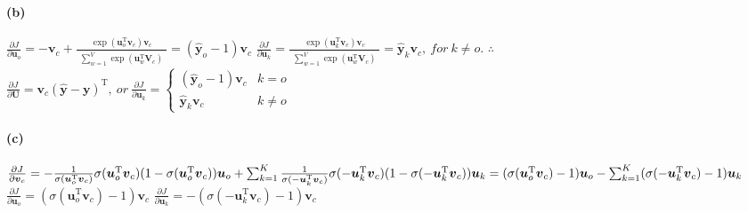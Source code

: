 \documentclass{article}
\begin{document}
\begin{spacing}{1.5}
\paragraph{(b)}
$ \frac{\partial J}{\partial \boldsymbol{u}_o}=-\boldsymbol{v}_c+ \frac{\exp(\boldsymbol{u}_o ^\mathrm{T}\boldsymbol{v}_c)\boldsymbol{v}_c}{\begin{matrix} \sum_{w=1}^V\exp(\boldsymbol{u}_w ^\mathrm{T}\boldsymbol{V}_c) \end{matrix}}=(\boldsymbol{\widehat{y}}_{o}-1)\boldsymbol{v}_c $ \newline
$ \frac{\partial J}{\partial \boldsymbol{u}_k}=\frac{\exp(\boldsymbol{u}_k ^\mathrm{T}\boldsymbol{v}_c)\boldsymbol{v}_c}{\begin{matrix} \sum_{w=1}^V\exp(\boldsymbol{u}_w ^\mathrm{T}\boldsymbol{V}_c) \end{matrix}}=\boldsymbol{\widehat{y}}_{k}\boldsymbol{v}_c,\ for \ k \neq o $. \newline
$ \boldsymbol{\therefore} $
$ \frac{\partial J}{\partial \boldsymbol{U}}=\boldsymbol{v}_c (\boldsymbol{\widehat{y}}-\boldsymbol{y})^\mathrm{T},\ or \ 
\frac{\partial J}{\partial \boldsymbol{u}_k}=
\begin{cases} (\boldsymbol{\widehat{y}}_{o}-1)\boldsymbol{v}_c &k=o \\ \boldsymbol{\widehat{y}}_{k}\boldsymbol{v}_c &k \neq o \end{cases} $
\paragraph{(c)}
$ \frac {\partial J}{\partial \boldsymbol{v}_c}=-\frac{1}{\sigma(\boldsymbol{u}_o ^\mathrm{T}\boldsymbol{v}_c)} \sigma(\boldsymbol{u}_o ^\mathrm{T}\boldsymbol{v}_c) (1-\sigma(\boldsymbol{u}_o ^\mathrm{T}\boldsymbol{v}_c)) \boldsymbol{u}_o
+ \sum_{k=1}^K \frac{1}{\sigma(-\boldsymbol{u}_k ^\mathrm{T}\boldsymbol{v}_c)} \sigma(-\boldsymbol{u}_k ^\mathrm{T}\boldsymbol{v}_c)(1-\sigma(-\boldsymbol{u}_k ^\mathrm{T}\boldsymbol{v}_c)) \boldsymbol{u}_k \\
=(\sigma(\boldsymbol{u}_o ^\mathrm{T}\boldsymbol{v}_c)-1) \boldsymbol{u}_o
-\sum_{k=1}^K(\sigma(-\boldsymbol{u}_k ^\mathrm{T}\boldsymbol{v}_c)-1) \boldsymbol{u}_k $ \newline
$ \frac {\partial J}{\partial \boldsymbol{u}_o}=(\sigma(\boldsymbol{u}_o ^\mathrm{T}\boldsymbol{v}_c)-1)\boldsymbol{v}_c $ \newline
$ \frac {\partial J}{\partial \boldsymbol{u}_k}=-(\sigma(-\boldsymbol{u}_k ^\mathrm{T}\boldsymbol{v}_c)-1)\boldsymbol{v}_c $

\end{spacing}
\end{document}
